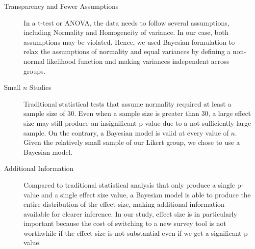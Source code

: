 \begin{description}
    \item[Transparency and Fewer Assumptions]
    In a t-test or ANOVA, 
    the data needs to follow several assumptions, 
    including Normality and Homogeneity of variance. 
    In our case, both assumptions may be violated. 
    Hence, we used Bayesian formulation 
    to relax the assumptions of normality and 
    equal variances by defining 
    a non-normal likelihood function 
    and making variances independent across groups.
    \item[Small $n$ Studies] 
    Traditional statistical tests 
    that assume normality 
    required at least a sample size of 30. 
    Even when a sample size is greater than 30, 
    a large effect size may still produce 
    an insignificant p-value 
    due to a not sufficiently large sample. 
    On the contrary, 
    a Bayesian model is valid at every value of $n$. 
    Given the relatively small sample 
    of our Likert group, 
    we chose to use a Bayesian model.
    \item[Additional Information] 
    Compared to traditional statistical analysis 
    that only produce a single p-value 
    and a single effect size value, 
    a Bayesian model is able to produce 
    the entire distribution of the effect size, 
    making additional information available 
    for clearer inference. 
    In our study, 
    effect size is in particularly important 
    because the cost of switching to a new survey tool 
    is not worthwhile 
    if the effect size is not substantial 
    even if we get a significant p-value.
\end{description}





